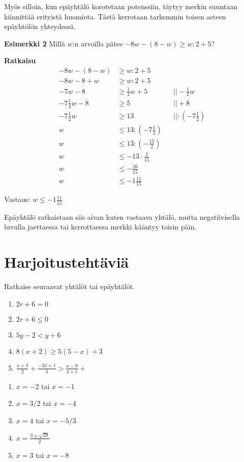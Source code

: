 Myös silloin, kun epäyhtälö korotetaan potenssiin, täytyy merkin suuntaan kiinnittää erityistä huomiota.
Tästä kerrotaan tarkemmin toisen asteen epäyhtölön yhteydessä.

\textbf{Esimerkki 2}
Millä $w$:n arvoilla pätee $-8w-(8-w)\geq w:2+5$?

\textbf{Ratkaisu}
\begin{align*}
-8w-(8-w)&\geq w:2+5 \\
-8w-8+w&\geq w:2+5 \\
-7w-8&\geq \frac12 w+5  \ \ \ \ \ &&|| -\frac12 w \\
-7\frac12 w-8&\geq 5  \ \ \ \ \ &&|| +8 \\
-7\frac12 w&\geq 13  \ \ \ \ \ &&|| :(-7\frac12) \\
w&\leq 13:(-7\frac12) \\
w&\leq 13:(-\frac{15}{2}) \\
w&\leq -13\cdot \frac{2}{15} \\
w&\leq -\frac{26}{15} \\
w&\leq -1\frac{11}{15}
\end{align*}

Vastaus: $w\leq -1\frac{11}{15}$

Epäyhtälö ratkaistaan siis aivan kuten vastaava yhtälö, mutta negatiivisella luvulla
jaettaessa tai kerrottaessa merkki kääntyy toisin päin.

\section{Harjoitustehtäviä}
\begin{tehtava}
    Ratkaise seuraavat yhtälöt tai epäyhtälöt.
    \begin{enumerate}
        \item $2r+6=0$
        \item $2r+6\leq 0$
        \item $5y-2<y+6$
        \item $8(x+2)\geq 5(5-x)+3$
        \item $\frac{x+3}{2}+\frac{-2x+1}{3}>\frac{x-9}{4+1}+$
    \end{enumerate}
    \begin{vastaus}
        \begin{enumerate}
            \item $x=-2$ tai $x=-1$
            \item $x=3/2$ tai $x=-4$
            \item $x=4$ tai $x=-5/3$
            \item $x=\frac{3\pm\sqrt{29}}{2}$
            \item $x=3$ tai $x=-8$
        \end{enumerate}
    \end{vastaus}
\end{tehtava}

